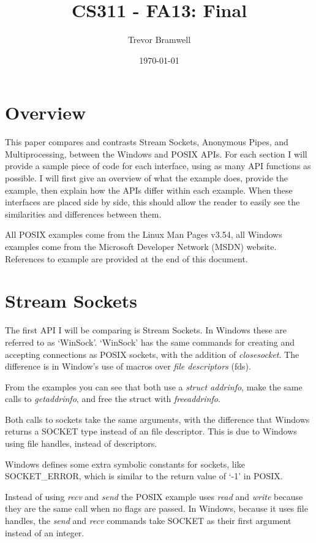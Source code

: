 \documentclass[letterpaper,10pt]{article}
\title{CS311 - FA13: Final}
\date{\today}
\author{Trevor Bramwell}
\begin{document}
\maketitle

\section{Overview}

This paper compares and contrasts Stream Sockets, Anonymous Pipes, and
Multiprocessing, between the Windows and POSIX APIs. For each section I
will provide a sample piece of code for each interface, using as many
API functions as possible. I will first give an overview of what the
example does, provide the example, then explain how the APIs differ
within each example. When these interfaces are placed side by side, this
should allow the reader to easily see the similarities and differences
between them.

All POSIX examples come from the Linux Man Pages v3.54, all Windows
examples come from the Microsoft Developer Network (MSDN) website.
References to example are provided at the end of this document.

\section{Stream Sockets}

The first API I will be comparing is Stream Sockets. In Windows these are
referred to as `WinSock'. `WinSock' has the same commands for
creating and accepting connections as POSIX sockets, with the addition
of \emph{closesocket}. The difference is in Window's use of macros over
\emph{file descriptors} (fds).




From the examples you can see that both use a \emph{struct addrinfo},
make the same calls to \emph{getaddrinfo}, and free the struct with
\emph{freeaddrinfo}.

Both calls to sockets take the same arguments, with the difference that
Windows returns a SOCKET type instead of an file descriptor. This is due
to Windows using file handles, instead of descriptors.

Windows defines some extra symbolic constants for sockets, like
SOCKET\_ERROR, which is similar to the return value of `-1' in POSIX.

Instead of using \emph{recv} and \emph{send} the POSIX example uses
\emph{read} and \emph{write} because they are the same call when no
flags are passed. In Windows, because it uses file handles, the
\emph{send} and \emph{recv} commands take SOCKET as their first argument
instead of an integer.
\end{document}
